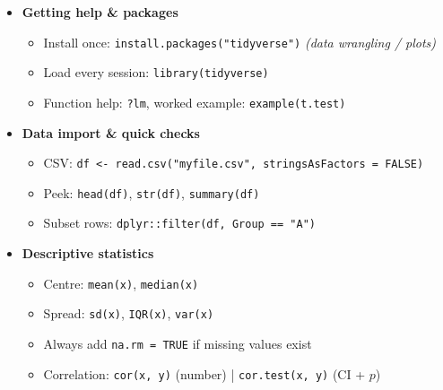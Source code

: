 \documentclass[12pt]{book}
\begin{document}

\newpage
\pagestyle{fancy}

\begin{itemize}

\item \textbf{Getting help \& packages}
  \begin{itemize}
    \item Install once: \texttt{install.packages("tidyverse")}  \hfill\emph{(data wrangling / plots)}
    \item Load every session: \texttt{library(tidyverse)}
    \item Function help: \texttt{?lm}, worked example: \texttt{example(t.test)}
  \end{itemize}

\item \textbf{Data import \& quick checks}
  \begin{itemize}
    \item CSV: \texttt{df <- read.csv("myfile.csv", stringsAsFactors = FALSE)}
    \item Peek: \texttt{head(df)}, \texttt{str(df)}, \texttt{summary(df)}
    \item Subset rows: \texttt{dplyr::filter(df, Group == "A")}
  \end{itemize}

\item \textbf{Descriptive statistics}
  \begin{itemize}
    \item Centre: \texttt{mean(x)}, \texttt{median(x)}
    \item Spread: \texttt{sd(x)}, \texttt{IQR(x)}, \texttt{var(x)}
    \item Always add \texttt{na.rm = TRUE} if missing values exist
    \item Correlation: \texttt{cor(x, y)} (number) \; | \;
          \texttt{cor.test(x, y)} (CI + $p$)
  \end{itemize}


\end{itemize}
\end{document}
